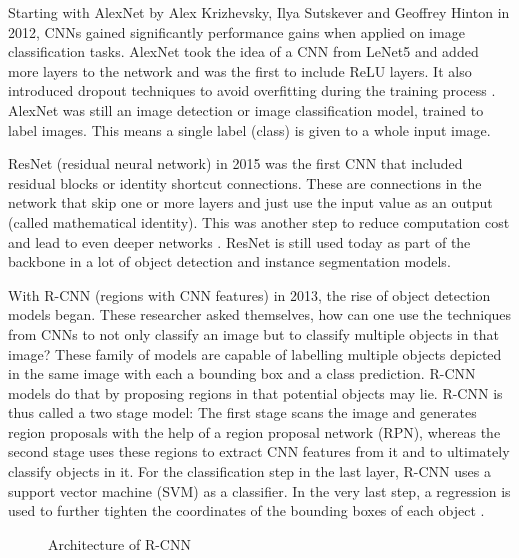 Starting with AlexNet by Alex Krizhevsky, Ilya Sutskever and Geoffrey Hinton in 2012, CNNs gained significantly performance gains when applied on image classification tasks. AlexNet took the idea of a CNN from LeNet5 and added more layers to the network and was the first to include ReLU layers. It also introduced dropout techniques to avoid overfitting during the training process \cite{AlexNet}. AlexNet was still an image detection or image classification model, trained to label images. This means a single label (class) is given to a whole input image.

ResNet (residual neural network) in 2015 was the first CNN that included residual blocks or identity shortcut connections. These are connections in the network that skip one or more layers and just use the input value as an output (called mathematical identity). This was another step to reduce computation cost and lead to even deeper networks \cite{ResNet}. ResNet is still used today as part of the backbone in a lot of object detection and instance segmentation models.

With R-CNN (regions with CNN features) in 2013, the rise of object detection models began. These researcher asked themselves, how can one use the techniques from CNNs to not only classify an image but to classify multiple objects in that image?  These family of models are capable of labelling multiple objects depicted in the same image with each a bounding box and a class prediction. R-CNN models do that by proposing regions in that potential objects may lie. R-CNN is thus called a two stage model: The first stage scans the image and generates region proposals with the help of a region proposal network (RPN), whereas the second stage uses these regions to extract CNN features from it and to ultimately classify objects in it. For the classification step in the last layer, R-CNN uses a support vector machine (SVM) as a classifier. In the very last step, a regression is used to further tighten the coordinates of the bounding boxes of each object \cite{R-CNN}.

\begin{figure}[H]
	\caption{\label{fig:r-cnn} Architecture of R-CNN}
\end{figure}

